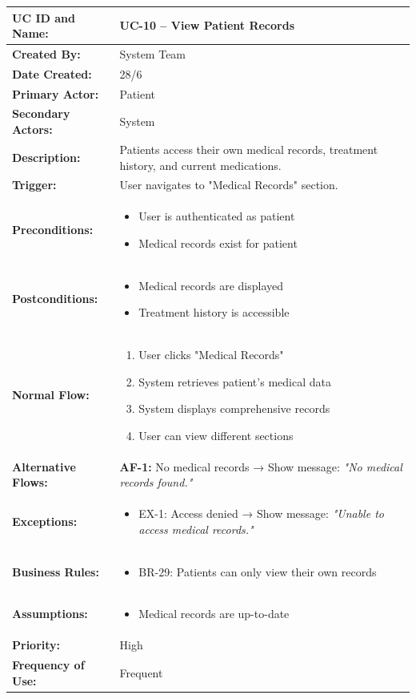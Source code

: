\documentclass[12pt,a4paper]{article}
\begin{document}
\renewcommand{\arraystretch}{1.5}
\begin{longtable}{|p{4.5cm}|p{10.5cm}|}
\hline
\textbf{UC ID and Name:} & UC-10 – View Patient Records \\
\hline
\textbf{Created By:} & System Team \\
\hline
\textbf{Date Created:} & 28/6 \\
\hline
\textbf{Primary Actor:} & Patient \\
\hline
\textbf{Secondary Actors:} & System \\
\hline
\textbf{Description:} & Patients access their own medical records, treatment history, and current medications. \\
\hline
\textbf{Trigger:} & User navigates to "Medical Records" section. \\
\hline
\textbf{Preconditions:} &
\begin{itemize}
  \item User is authenticated as patient
  \item Medical records exist for patient
\end{itemize} \\
\hline
\textbf{Postconditions:} &
\begin{itemize}
  \item Medical records are displayed
  \item Treatment history is accessible
\end{itemize} \\
\hline
\textbf{Normal Flow:} &
\begin{enumerate}
  \item User clicks "Medical Records"
  \item System retrieves patient's medical data
  \item System displays comprehensive records
  \item User can view different sections
\end{enumerate} \\
\hline
\textbf{Alternative Flows:} &
\textbf{AF-1:} No medical records → Show message: \textit{"No medical records found."} \\
\hline
\textbf{Exceptions:} &
\begin{itemize}
  \item EX-1: Access denied → Show message: \textit{"Unable to access medical records."}
\end{itemize} \\
\hline
\textbf{Business Rules:} &
\begin{itemize}
  \item BR-29: Patients can only view their own records
\end{itemize} \\
\hline
\textbf{Assumptions:} &
\begin{itemize}
  \item Medical records are up-to-date
\end{itemize} \\
\hline
\textbf{Priority:} & High \\
\hline
\textbf{Frequency of Use:} & Frequent \\
\hline
\end{longtable}
\end{document}
